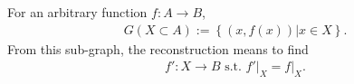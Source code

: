 \documentclass[10pt]{article}
\begin{document}
For an arbitrary function $f: A \to B$,
\begin{eqnarray} \nonumber
G(X \subset A) := \left\{ \left. (x, f(x)) \right| x \in X \right\}.
\end{eqnarray}
From this sub-graph, the reconstruction means to find
\begin{eqnarray} \nonumber
f' : X \to B \text{ s.t. } \left. f' \right|_X = \left. f \right|_X.
\end{eqnarray}
\end{document}
